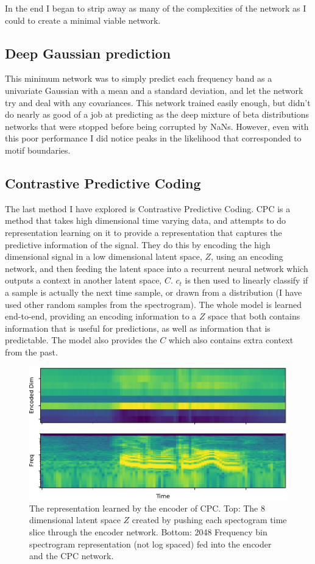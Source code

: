 In the end I began to strip away as many of the complexities of the network as I could to create a minimal viable network.

\subsection{Deep Gaussian prediction}
This minimum network was to simply predict each frequency band as a univariate Gaussian with a mean and a standard deviation, and let the network try and deal with any covariances. This network trained easily enough, but didn't do nearly as good of a job at predicting as the deep mixture of beta distributions networks that were stopped before being corrupted by NaNs. However, even with this poor performance I did notice peaks in the likelihood that corresponded to motif boundaries.

\subsection{Contrastive Predictive Coding}
The last method I have explored is Contrastive Predictive Coding\cite{CPC}. CPC is a method that takes high dimensional time varying data, and attempts to do representation learning on it to provide a representation that captures the predictive information of the signal. They do this by encoding the high dimensional signal in a low dimensional latent space, $Z$, using an encoding network, and then feeding the latent space into a recurrent neural network which outputs a context in another latent space, $C$. $c_t$ is then used to linearly classify if a sample is actually the next time sample, or drawn from a distribution (I have used other random samples from the spectrogram). The whole model is learned end-to-end, providing an encoding information to a $Z$ space that both contains information that is useful for predictions, as well as information that is predictable. The model also provides the $C$ which also contains extra context from the past.

\begin{figure}[tbp] 
  \centering
  \includegraphics[width=\textwidth]{figures/encoder.pdf}
  \caption[8 dimensional $Z$ space learned by Contrastive Predictive Coding.]
{The representation learned by the encoder of CPC. Top: The 8 dimensional latent space $Z$ created by pushing each spectogram time slice through the encoder network. Bottom: 2048 Frequency bin spectrogram representation (not log spaced) fed into the encoder and the CPC network.
}
  \label{fig:encoder}
\end{figure}


